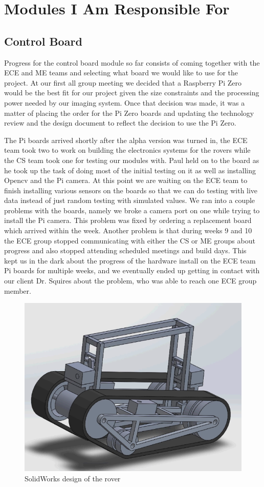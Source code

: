 \documentclass[10pt,letterpaper,onecolumn,draftclsnofoot,journal]{IEEEtran}
\begin{document}
\section{Modules I Am Responsible For}

\subsection{Control Board}
Progress for the control board module so far consists of coming together with the ECE and ME teams and selecting what board we would like to use for the project. At our first all group meeting we decided that a Raspberry Pi Zero would be the best fit for our project given the size constraints and the processing power needed by our imaging system. Once that decision was made, it was a matter of placing the order for the Pi Zero boards and updating the technology review and the design document to reflect the decision to use the Pi Zero.
\par
The Pi boards arrived shortly after the alpha version was turned in, the ECE team took two to work on building the electronics systems for the rovers while the CS team took one for testing our modules with. Paul held on to the board as he took up the task of doing most of the initial testing on it as well as installing Opencv and the Pi camera. At this point we are waiting on the ECE team to finish installing various sensors on the boards so that we can do testing with live data instead of just random testing with simulated values. We ran into a couple problems with the boards, namely we broke a camera port on one while trying to install the Pi camera. This problem was fixed by ordering a replacement board which arrived within the week. Another problem is that during weeks 9 and 10 the ECE group stopped communicating with either the CS or ME groups about progress and also stopped attending scheduled meetings and build days. This kept us in the dark about the progress of the hardware install on the ECE team Pi boards for multiple weeks, and we eventually ended up getting in contact with our client Dr. Squires about the problem, who was able to reach one ECE group member.
\begin{figure}[H]
	\centering
	\includegraphics[scale = .4]{Capture.PNG}
	\caption{SolidWorks design of the rover}
	\label{fig:design}
\end{figure}
\end{document}
